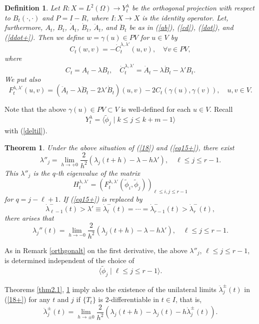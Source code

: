 \documentclass[final,a4paper]{jmsj}
\theoremstyle{thmstyleone}%
\newtheorem{theorem}{Theorem}
\theoremstyle{thmstyletwo}%
\theoremstyle{thmstylethree}%
\newtheorem{definition}{Definition}%
\begin{document}
\begin{definition}\label{def2} 
Let $R:X=L^2(\Omega)\rightarrow Y^\lambda_t$ be the orthogonal projection with respect to $B_t(\cdot, \cdot)$ and $P=I-R$, where $I:X\rightarrow X$ is the identity operator. Let, furthermore, $A_t$, $B_t$, $\dot A_t$, $\dot B_t$, $\ddot A_t$, and $\ddot B_t$ be as in (\ref{ab}), (\ref{cd}), (\ref{dot}), and (\ref{ddot+}).  
Then we define $w=\gamma(u)\in PV$ for $u\in V$ by 
\[ C_t(w,v)=-\dot C_t^{\lambda, \lambda'}(u, v), \quad \forall v\in PV,  \] 
where 
\[ C_t=A_t-\lambda B_t, \quad \dot C_t^{\lambda, \lambda'}=\dot A_t-\lambda \dot B_t-\lambda'B_t.  \] 
We put also   
\[ F_t^{\lambda, \lambda'}(u,v)=(\ddot A_t-\lambda \ddot B_t-2\lambda'\dot B_t)(u,v)-2C_t(\gamma(u), \gamma(v)), \quad u, v\in V. \]  
\end{definition} 

Note that the above $\gamma(u)\in PV\subset V$ is well-defined for each $u\in V$. Recall 
\[ Y^\lambda_t=\langle \tilde\phi_j \mid k\leq j\leq k+m-1 \rangle \] 
with (\ref{deltil}).  

\begin{theorem}\label{thmsecond}
Under the above situation of (\ref{18}) and (\ref{eq15+}), there exist  
\begin{equation} 
\lambda''_j=\lim_{h\rightarrow +0}\frac{2}{h^2}(\lambda_j(t+h)-\lambda-h\lambda'), \quad \ell \leq j\leq r-1.  
 \label{2deri}
\end{equation}
This $\lambda''_j$ is the $q$-th eigenvalue of the matrix 
\[ H^{\lambda, \lambda'}_t=\left( F^{\lambda, \lambda'}_t(\tilde \phi_i, \tilde \phi_j)\right)_{\ell \leq i, j\leq r-1} \] 
for $q=j-\ell+1$. %
If (\ref{eq15+}) is replaced by 
\[ \dot\lambda^-_{\ell-1}(t)>\lambda'\equiv \dot \lambda^-_{\ell}(t)=\cdots=\dot \lambda_{r-1}^-(t)>\dot \lambda_{r}^-(t),  \] 
there arises that   
\[ \lambda_j''(t)=\lim_{h\rightarrow -0}\frac{2}{h^2}(\lambda_j(t+h)-\lambda-h\lambda'), \quad \ell \leq j\leq r-1.  \] 
\end{theorem} 

As in Remark \ref{orthgonalt} on the first derivative, the above $\lambda''_j$, $\ell\leq j\leq r-1$, is determined  independent of the choice of 
\[ \langle \tilde \phi_j \mid \ell \leq j\leq r-1\rangle. \] 

Theorems \ref{thm2.1}, \ref{thmsecond} imply also the existence of the unilateral limits $\ddot \lambda_j^\pm(t)$ in (\ref{18+}) for any $t$ and $j$ if $\{ T_t\}$ is $2$-differentiable in $t\in I$, that is, 
\[ \ddot \lambda_j^\pm(t)=\lim_{h\rightarrow \pm 0}\frac{2}{h^2}(\lambda_j(t+h)-\lambda_j(t)-h\dot \lambda_j^\pm(t)). \] 
\end{document}
